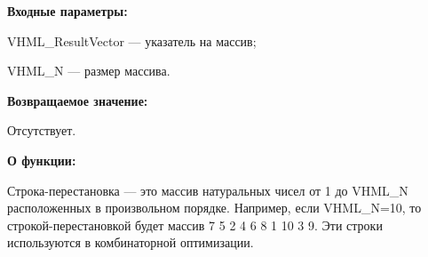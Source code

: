 \textbf{Входные параметры:}
 
VHML\_ResultVector --- указатель на массив;
 
VHML\_N --- размер массива.

\textbf{Возвращаемое значение:} 

Отсутствует.

\textbf{О функции:}

Строка-перестановка --- это массив натуральных чисел от 1 до VHML\_N расположенных в произвольном порядке. Например, если VHML\_N=10, то строкой-перестановкой будет массив 7 5 2 4 6 8 1 10 3 9. Эти строки используются в комбинаторной оптимизации.